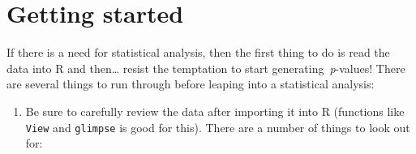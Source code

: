 \documentclass[
]{book}
\begin{document}
\hypertarget{getting-started}{%
\section{Getting started}\label{getting-started}}

If there is a need for statistical analysis, then the first thing to do is read the data into R and then\ldots{} resist the temptation to start generating~\emph{p}-values! There are several things to run through before leaping into a statistical analysis:

\begin{enumerate}
\def\labelenumi{\arabic{enumi}.}
\item
  Be sure to carefully review the data after importing it into R (functions like \texttt{View} and \texttt{glimpse} is good for this). There are a number of things to look out for:


\end{enumerate}
\end{document}
